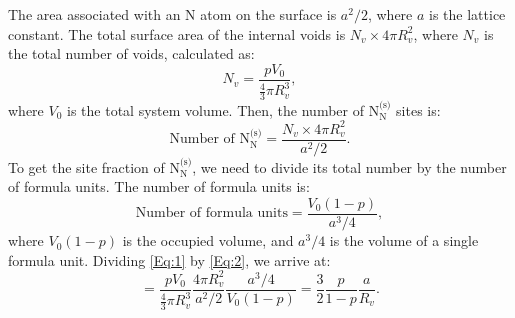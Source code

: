 \documentclass[preprint,12pt,sort&compress]{elsarticle}
\newcommand{\?}{\stackrel{?}{=}}
\begin{document}
The area associated with an N atom on the surface is $a^2/2$, where $a$ is the lattice constant. The total surface area of the internal voids is $N_v \times 4 \pi R_v^2$, where $N_v$ is the total number of voids, calculated as:
\begin{equation}
N_v = \frac{ p V_0 }{ \frac{4}{3} \pi R_v^3 },
\end{equation}
where $V_0$ is the total system volume. Then, the number of $\text{N}_\text{N}^\text{(s)}$ sites is:
\begin{equation}
\text{Number of } \text{N}_\text{N}^\text{(s)} = \frac{ N_v \times 4 \pi R_v^2 }{ a^2 / 2 }. 
\label{Eq:1}
\end{equation}
To get the site fraction of $\text{N}_\text{N}^\text{(s)}$, we need to divide its total number by the number of formula units. The number of formula units is:
\begin{equation}
\text{Number of formula units} = \frac{V_0 (1 - p)}{ a^3 / 4 }, 
\label{Eq:2}
\end{equation}
where $V_0 (1 - p)$ is the occupied volume, and $a^3 / 4$ is the volume of a single formula unit. Dividing \cref{Eq:1} by \cref{Eq:2}, we arrive at:
\begin{equation}
[ \text{N}_\text{N}^\text{(s)} ] = \frac{p V_0}{ \frac{4}{3} \pi R_v^3 } \frac{4 \pi R_v^2}{a^2/2}  \frac{ a^3/4 }{ V_0 (1 - p) } = \frac{3}{2} \frac{p}{1-p} \frac{a}{R_v}.
\label{Eq:NNs}
\end{equation}
\end{document}
